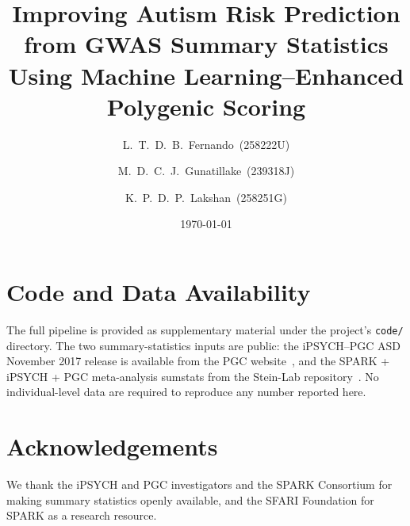 \documentclass[10pt,twocolumn]{article}
\title{Improving Autism Risk Prediction from GWAS Summary Statistics
       Using Machine Learning--Enhanced Polygenic Scoring}
\author[1]{L.~T.~D.~B.~Fernando~(258222U)}
\author[1]{M.~D.~C.~J.~Gunatillake~(239318J)}
\author[1]{K.~P.~D.~P.~Lakshan~(258251G)}
\affil[1]{University of Moratuwa}
\date{\today}
\begin{document}
\twocolumn[
  \begin{@twocolumnfalse}
    \maketitle
    \begin{abstract}
      
    \end{abstract}
    \vspace{0.5em}
  \end{@twocolumnfalse}
]








\section*{Code and Data Availability}
The full pipeline is provided as supplementary material under the project's
\texttt{code/} directory. The two summary-statistics inputs are public:
the iPSYCH--PGC ASD November 2017 release is available from the PGC
website~\cite{grove2019}, and the SPARK + iPSYCH + PGC meta-analysis
sumstats from the Stein-Lab repository~\cite{matoba2020}. No
individual-level data are required to reproduce any number reported here.

\section*{Acknowledgements}
We thank the iPSYCH and PGC investigators and the SPARK Consortium for
making summary statistics openly available, and the SFARI Foundation for
SPARK as a research resource.



\end{document}
